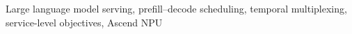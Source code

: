 \documentclass[10pt,letterpaper]{article}
\begin{document}
\maketitle


\begin{keywords}
Large language model serving, prefill--decode scheduling, temporal multiplexing,
service-level objectives, Ascend NPU
\end{keywords}







\clearpage
\small


\end{document}

